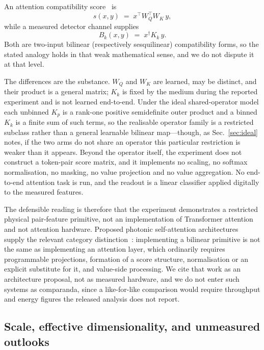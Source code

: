 \documentclass[11pt,a4paper]{article}
\begin{document}
An attention compatibility score~\cite{attention} is
\begin{equation}
  s(x,y) \;=\; x^{\top} W_Q^{\top} W_K\, y ,
\end{equation}
while a measured detector channel supplies
\begin{equation}
  B_k(x,y) \;=\; x^{\dagger} K_k\, y .
\end{equation}
Both are two-input bilinear (respectively sesquilinear) compatibility forms,
so the stated analogy holds in that weak mathematical sense, and we do not
dispute it at that level.

The differences are the substance. $W_Q$ and $W_K$ are learned, may be
distinct, and their product is a general matrix; $K_k$ is fixed by the medium
during the reported experiment and is not learned end-to-end. Under the ideal shared-operator model each
unbinned $K_p$ is a rank-one positive semidefinite outer product and a binned
$K_k$ is a finite sum of such terms, so the realisable operator family is a
restricted subclass rather than a general learnable bilinear map---though, as
Sec.~\ref{sec:ideal} notes, if the two arms do not share an operator this
particular restriction is weaker than it appears. Beyond the operator itself,
the experiment does not construct a token-pair score matrix, and it implements
no scaling, no softmax normalisation, no masking, no value projection and no
value aggregation. No end-to-end attention task is run, and the readout is a
linear classifier applied digitally to the measured features.

The defensible reading is therefore that the experiment demonstrates a
restricted physical pair-feature primitive, not an implementation of
Transformer attention and not attention hardware. Proposed photonic
self-attention architectures supply the relevant category
distinction~\cite{lightening}: implementing a bilinear primitive is not the
same as implementing an attention layer, which ordinarily requires
programmable projections, formation of a score structure, normalisation or an
explicit substitute for it, and value-side processing. We cite that work as an
architecture proposal, not as measured hardware, and we do not enter such
systems as comparanda, since a like-for-like comparison would require
throughput and energy figures the released analysis does not report.

\subsection{Scale, effective dimensionality, and unmeasured outlooks}
\end{document}
